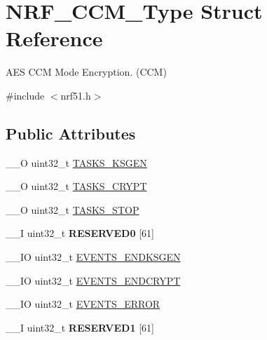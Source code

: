 \hypertarget{struct_n_r_f___c_c_m___type}{}\section{N\+R\+F\+\_\+\+C\+C\+M\+\_\+\+Type Struct Reference}
\label{struct_n_r_f___c_c_m___type}


A\+E\+S C\+C\+M Mode Encryption. (C\+C\+M)  




{\ttfamily \#include $<$nrf51.\+h$>$}

\subsection*{Public Attributes}
\begin{DoxyCompactItemize}
\item 
\+\_\+\+\_\+\+O uint32\+\_\+t \hyperlink{struct_n_r_f___c_c_m___type_a36ed958edc61a58b5897f264d46e52f0}{T\+A\+S\+K\+S\+\_\+\+K\+S\+G\+E\+N}
\item 
\+\_\+\+\_\+\+O uint32\+\_\+t \hyperlink{struct_n_r_f___c_c_m___type_ae0bdba9d36b8e92042c5e654010abd3d}{T\+A\+S\+K\+S\+\_\+\+C\+R\+Y\+P\+T}
\item 
\+\_\+\+\_\+\+O uint32\+\_\+t \hyperlink{struct_n_r_f___c_c_m___type_ae71a4a1aee0280d39898d45e6758e22d}{T\+A\+S\+K\+S\+\_\+\+S\+T\+O\+P}
\item 
\hypertarget{struct_n_r_f___c_c_m___type_afa82320876c0e6c0d4fa00b0c7008a71}{}\+\_\+\+\_\+\+I uint32\+\_\+t {\bfseries R\+E\+S\+E\+R\+V\+E\+D0} \mbox{[}61\mbox{]}\label{struct_n_r_f___c_c_m___type_afa82320876c0e6c0d4fa00b0c7008a71}

\item 
\+\_\+\+\_\+\+I\+O uint32\+\_\+t \hyperlink{struct_n_r_f___c_c_m___type_a7262e101e3fd59363dfa1fc81cea682a}{E\+V\+E\+N\+T\+S\+\_\+\+E\+N\+D\+K\+S\+G\+E\+N}
\item 
\+\_\+\+\_\+\+I\+O uint32\+\_\+t \hyperlink{struct_n_r_f___c_c_m___type_a7685417bf9c09d4f0593e3a341c35d75}{E\+V\+E\+N\+T\+S\+\_\+\+E\+N\+D\+C\+R\+Y\+P\+T}
\item 
\+\_\+\+\_\+\+I\+O uint32\+\_\+t \hyperlink{struct_n_r_f___c_c_m___type_acdf389df7cbd32763125d2879c81fc2c}{E\+V\+E\+N\+T\+S\+\_\+\+E\+R\+R\+O\+R}
\item 
\hypertarget{struct_n_r_f___c_c_m___type_a65bf116ec915d1c379590ff0a7e2497e}{}\+\_\+\+\_\+\+I uint32\+\_\+t {\bfseries R\+E\+S\+E\+R\+V\+E\+D1} \mbox{[}61\mbox{]}\label{struct_n_r_f___c_c_m___type_a65bf116ec915d1c379590ff0a7e2497e}


\end{DoxyCompactItemize}
